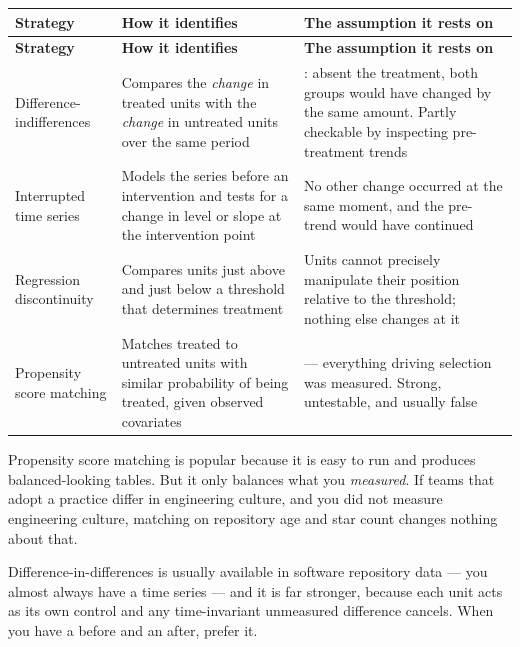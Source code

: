 \begin{center}
\small
\begin{longtable}{@{}L{2.7cm}L{4.6cm}L{6.4cm}@{}}
\toprule
\textbf{Strategy} & \textbf{How it identifies} & \textbf{The assumption it rests on} \\
\midrule
\endfirsthead
\toprule
\textbf{Strategy} & \textbf{How it identifies} & \textbf{The assumption it rests on} \\
\midrule
\endhead
\bottomrule
\endfoot
Difference-in\-differences
  & Compares the \emph{change} in treated units with the \emph{change} in
    untreated units over the same period
  & : absent the treatment, both groups would have
    changed by the same amount. Partly checkable by inspecting pre-treatment
    trends \\
Interrupted time series
  & Models the series before an intervention and tests for a change in level
    or slope at the intervention point
  & No other change occurred at the same moment, and the pre-trend would have
    continued \\
Regression discontinuity
  & Compares units just above and just below a threshold that determines
    treatment
  & Units cannot precisely manipulate their position relative to the
    threshold; nothing else changes at it \\
Propensity score matching
  & Matches treated to untreated units with similar probability of being
    treated, given observed covariates
  &  --- everything driving selection was
    measured. Strong, untestable, and usually false \\
\end{longtable}
\end{center}

\begin{alertbox}
Propensity score matching is popular because it is easy to run and produces
balanced-looking tables. But it only balances what you \emph{measured}. If
teams that adopt a practice differ in engineering culture, and you did not
measure engineering culture, matching on repository age and star count changes
nothing about that.

\medskip
Difference-in-differences is usually available in software repository data ---
you almost always have a time series --- and it is far stronger, because each
unit acts as its own control and any time-invariant unmeasured difference
cancels. When you have a before and an after, prefer it.
\end{alertbox}

